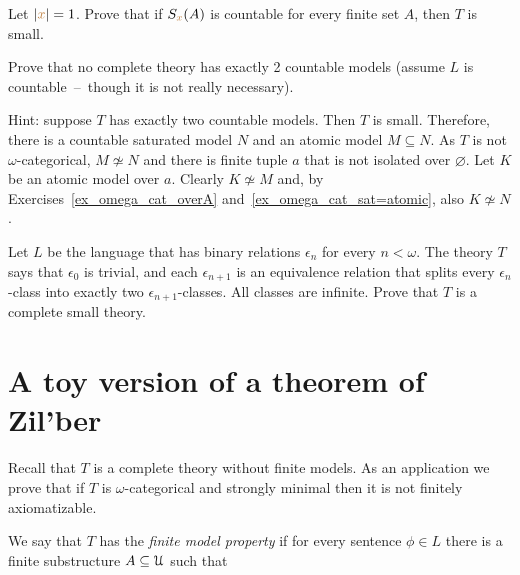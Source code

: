 
\begin{exercise}
Let $|{\color{brown} x}|=1$.
Prove that if $S_{{\color{brown} x}}(A)$ is countable for every finite set $A$, then $T$ is small.
\end{exercise}

\begin{exercise}[ (Vaught)]
Prove that no complete theory has exactly 2 countable models (assume $L$ is countable~--~though it is not really necessary).

Hint: suppose $T$ has exactly two countable models.
Then $T$ is small.
Therefore, there is a countable saturated model $N$ and an atomic model $M\subseteq N$.
As $T$ is not $\omega$-categorical, $M\not\simeq N$ and there is finite tuple $a$ that is not isolated over $\varnothing$.
Let $K$ be an atomic model over $a$.
Clearly $K\not\simeq M$ and, by Exercises~\ref{ex_omega_cat_overA} and~\ref{ex_omega_cat_sat=atomic}, also $K\not\simeq N$.
\end{exercise}

\begin{exercise}
   Let $L$ be the language that has binary relations $\epsilon_n$ for every $n < \omega$. The theory $T$ says that $\epsilon_0$ is trivial, and each $\epsilon_{n+1}$ is an equivalence relation that splits every $\epsilon_n$-class into exactly two $\epsilon_{n+1}$-classes. All classes are infinite.
   Prove that $T$ is a complete small theory.
\end{exercise}

\section{A toy version of a theorem of Zil'ber}\label{toy}

Recall that $T$ is a complete theory without finite models.
As an application we prove that if $T$ is $\omega$-categorical and strongly minimal then it is not finitely axiomatizable.

We say that $T$ has the \emph{finite model property\/} if for every sentence $\phi\in L$ there is a finite substructure $A\subseteq\EuScript U$ such that 

